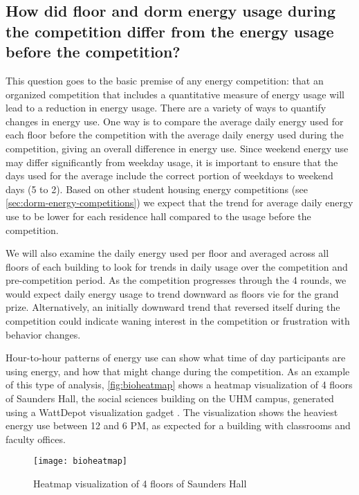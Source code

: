 \subsection[How did energy use change during the competition?]{How did floor and dorm energy usage during the competition differ from the energy usage before the competition?}
\label{sec:competition-energy}

This question goes to the basic premise of any energy competition: that an organized competition that includes a quantitative measure of energy usage will lead to a reduction in energy usage. There are a variety of ways to quantify changes in energy use. One way is to compare the average daily energy used for each floor before the competition with the average daily energy used during the competition, giving an overall difference in energy use. Since weekend energy use may differ significantly from weekday usage, it is important to ensure that the days used for the average include the correct portion of weekdays to weekend days (5 to 2). Based on other student housing energy competitions (see \autoref{sec:dorm-energy-competitions}) we expect that the trend for average daily energy use to be lower for each residence hall compared to the usage before the competition.

We will also examine the daily energy used per floor and averaged across all floors of each building to look for trends in daily usage over the competition and pre-competition period. As the competition progresses through the 4 rounds, we would expect daily energy usage to trend downward as floors vie for the grand prize. Alternatively, an initially downward trend that reversed itself during the competition could indicate waning interest in the competition or frustration with behavior changes.

Hour-to-hour patterns of energy use can show what time of day participants are using energy, and how that might change during the competition. As an example of this type of analysis, \autoref{fig:bioheatmap} shows a heatmap visualization of 4 floors of Saunders Hall, the social sciences building on the UHM campus, generated using a WattDepot visualization gadget \cite{WattDepotGadgets}. The visualization shows the heaviest energy use between 12 and 6 PM, as expected for a building with classrooms and faculty offices.

\begin{figure}[htbp]
	\centering
		\texttt{[image: bioheatmap]}
		\caption{Heatmap visualization of 4 floors of Saunders Hall}
		\label{fig:bioheatmap}
\end{figure}

